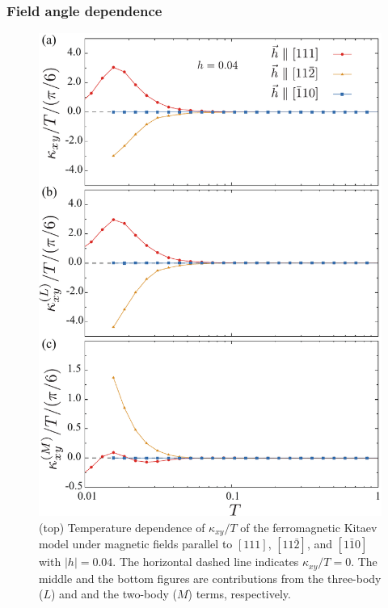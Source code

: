 \documentclass[reprint,amsmath,amssymb,aps,prx]{revtex4-2}
\begin{document}
   \subsubsection{Field angle dependence}
\begin{figure}
  \begin{center}
    \includegraphics[width=0.9\linewidth]{plot_k_all_h0.04_ab.pdf}
  \end{center}
  \caption{(top) Temperature dependence of $\kappa_{xy}/T$ of the ferromagnetic Kitaev model under magnetic fields parallel to $[111]$, $[11\bar{2}]$, and $[1\bar{1}0]$ with $|h|=0.04$. The horizontal dashed line indicates $\kappa_{xy}/T = 0$. The middle and the bottom figures are contributions from the three-body ($L$) and and the two-body ($M$) terms, respectively.}
  \label{fig:k_all_h0.04_ab}
\end{figure}
\end{document}
